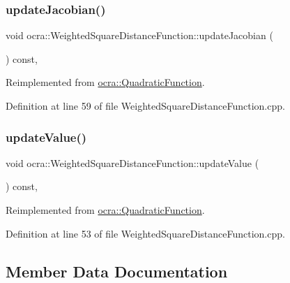 \subsubsection{\texorpdfstring{update\+Jacobian()}{updateJacobian()}}
{\footnotesize\ttfamily void ocra\+::\+Weighted\+Square\+Distance\+Function\+::update\+Jacobian (\begin{DoxyParamCaption}{ }\end{DoxyParamCaption}) const\hspace{0.3cm}{\ttfamily [protected]}, {\ttfamily [virtual]}}



Reimplemented from \hyperlink{classocra_1_1QuadraticFunction_ad8fb5839a78b8ffb201e8ec5bb42cd70}{ocra\+::\+Quadratic\+Function}.



Definition at line 59 of file Weighted\+Square\+Distance\+Function.\+cpp.

\hypertarget{classocra_1_1WeightedSquareDistanceFunction_a3edae3085677a5ac54b4d5bcdfcc1901}{}\label{classocra_1_1WeightedSquareDistanceFunction_a3edae3085677a5ac54b4d5bcdfcc1901} 
\subsubsection{\texorpdfstring{update\+Value()}{updateValue()}}
{\footnotesize\ttfamily void ocra\+::\+Weighted\+Square\+Distance\+Function\+::update\+Value (\begin{DoxyParamCaption}{ }\end{DoxyParamCaption}) const\hspace{0.3cm}{\ttfamily [protected]}, {\ttfamily [virtual]}}



Reimplemented from \hyperlink{classocra_1_1QuadraticFunction_aad5171c1f1b510fb861121da01a0ea75}{ocra\+::\+Quadratic\+Function}.



Definition at line 53 of file Weighted\+Square\+Distance\+Function.\+cpp.



\subsection{Member Data Documentation}
\hypertarget{classocra_1_1WeightedSquareDistanceFunction_a825041d63692b04a742c57dde4f80930}{}\label{classocra_1_1WeightedSquareDistanceFunction_a825041d63692b04a742c57dde4f80930} 
